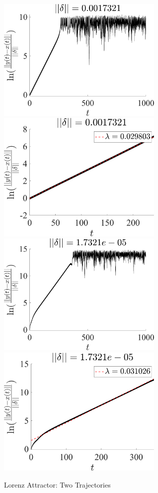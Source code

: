 \documentclass[11pt]{article}
\begin{document}
\begin{figure}[h]
\includegraphics[width=8cm]{Lorenz_r25.73682_trajectories_discp_delta2.png}
\includegraphics[width=8cm]{Lorenz_r25.73682_trajectories_discp2_delta2.png}
\includegraphics[width=8cm]{Lorenz_r25.73682_trajectories_discp_delta3.png}
\includegraphics[width=8cm]{Lorenz_r25.73682_trajectories_discp2_delta3.png}
\caption{Lorenz Attractor: Two Trajectories}
\end{figure}
\end{document}
